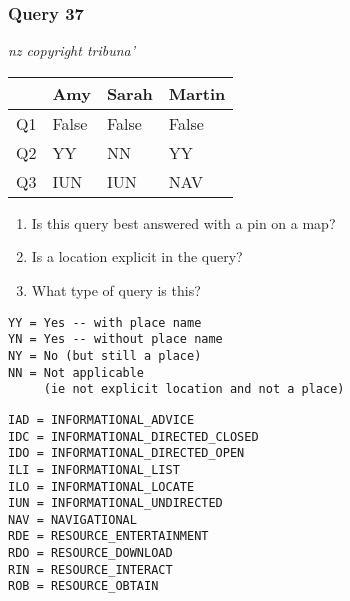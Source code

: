 \begin{frame}[fragile]
\frametitle{Query 37}
\vspace{1em}

\emph{nz copyright tribuna'}

\vfill

\begin{table}
  \centering
  \begin{tabular}{ l l l l }
    & \textbf{Amy} & \textbf{Sarah} & \textbf{Martin}\\
    \toprule
    Q1 & False & False & False\\
Q2 & YY & NN & YY\\
Q3 & IUN & IUN & NAV\\
    \bottomrule
  \end{tabular}
\end{table}

\vfill

\tiny{

\begin{enumerate}
\item Is this query best answered with a pin on a map?
\item Is a location explicit in the query?
\item What type of query is this?
\end{enumerate}

\vfill

\begin{multicols}{2}
\begin{verbatim}
YY = Yes -- with place name
YN = Yes -- without place name
NY = No (but still a place)
NN = Not applicable 
     (ie not explicit location and not a place)
\end{verbatim}

\columnbreak
\begin{verbatim}
IAD = INFORMATIONAL_ADVICE
IDC = INFORMATIONAL_DIRECTED_CLOSED
IDO = INFORMATIONAL_DIRECTED_OPEN
ILI = INFORMATIONAL_LIST
ILO = INFORMATIONAL_LOCATE
IUN = INFORMATIONAL_UNDIRECTED
NAV = NAVIGATIONAL
RDE = RESOURCE_ENTERTAINMENT
RDO = RESOURCE_DOWNLOAD
RIN = RESOURCE_INTERACT
ROB = RESOURCE_OBTAIN
\end{verbatim}
\end{multicols}
}

\end{frame}


